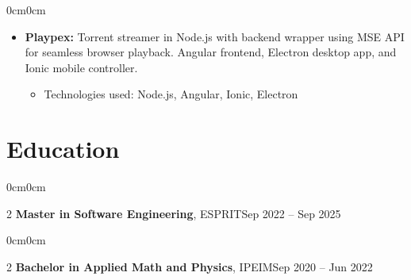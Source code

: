 \documentclass[10pt, a4paper]{article}
\newenvironment{highlights}{\begin{itemize}[topsep=0.10 cm, parsep=0.10 cm, partopsep=0pt, itemsep=0pt, leftmargin=0 cm + 10pt]}{\end{itemize}}
\newenvironment{highlightsforbulletentries}{\begin{itemize}[topsep=0.10 cm, parsep=0.10 cm, partopsep=0pt, itemsep=0pt, leftmargin=10pt]}{\end{itemize}}
\newenvironment{onecolentry}{\begin{adjustwidth}{0cm}{0cm}}{\end{adjustwidth}}
\newenvironment{twocolentry}[2][]{\onecolentry \def\secondColumn{#2} \setcolumnwidth{\fill, 4.5 cm} \begin{paracol}{2}}{\switchcolumn \raggedleft \secondColumn \end{paracol} \end{onecolentry}}
\begin{document}
\vspace{0.2 cm}
\begin{onecolentry}
  \begin{highlights}
  \item \textbf{Playpex:} Torrent streamer in Node.js with backend wrapper using MSE API for seamless browser playback. Angular frontend, Electron desktop app, and Ionic mobile controller.
    \begin{highlightsforbulletentries}
    \item Technologies used: Node.js, Angular, Ionic, Electron
    \end{highlightsforbulletentries}
  \end{highlights}
\end{onecolentry}

\section{Education}

\begin{twocolentry}{Sep 2022 -- Sep 2025}
\textbf{Master in Software Engineering}, ESPRIT\end{twocolentry}

\vspace{0.10 cm}
\begin{twocolentry}{Sep 2020 -- Jun 2022}
\textbf{Bachelor in Applied Math and Physics}, IPEIM\end{twocolentry}
\end{document}
